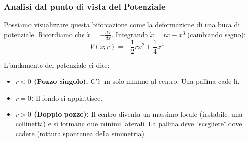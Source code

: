 \documentclass[openany]{book}
\theoremstyle{definition}
\theoremstyle{remark}
\begin{document}
\begin{center}
\end{center}

\subsubsection*{Analisi dal punto di vista del Potenziale}
Possiamo visualizzare questa biforcazione come la deformazione di una buca di potenziale.
Ricordiamo che $\dot{x} = - \frac{dV}{dx}$. Integrando $\dot{x} = rx - x^3$ (cambiando segno):
\[ V(x; r) = - \frac{1}{2}rx^2 + \frac{1}{4}x^4 \]

L'andamento del potenziale ci dice:
\begin{itemize}
    \item \textbf{$r < 0$ (Pozzo singolo):} C'è un solo minimo al centro. Una pallina cade lì.
    \item \textbf{$r = 0$:} Il fondo si appiattisce.
    \item \textbf{$r > 0$ (Doppio pozzo):} Il centro diventa un massimo locale (instabile, una collinetta) e si formano due minimi laterali. La pallina deve "scegliere" dove cadere (rottura spontanea della simmetria).
\end{itemize}
\end{document}

